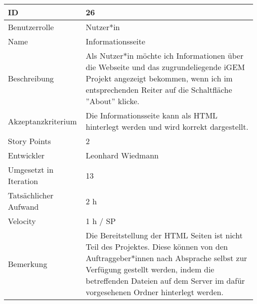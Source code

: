 \begin{tabularx}{\textwidth}{|p{}|X|}
	\hline
	ID & 26\\
	\hline
	Benutzerrolle & Nutzer*in\\
	\hline
	Name & Informationsseite\\
	\hline
	Beschreibung & Als Nutzer*in möchte ich Informationen über die Webseite und das zugrundeliegende iGEM Projekt angezeigt bekommen, wenn ich im entsprechenden Reiter auf die Schaltfläche ''About'' klicke.\\
	\hline
	Akzeptanzkriterium & Die Informationsseite kann als HTML hinterlegt werden und wird korrekt dargestellt.\\
	\hline
	Story Points & 2\\
	\hline
	Entwickler & Leonhard Wiedmann\\
	\hline
	Umgesetzt in Iteration & 13\\
	\hline
	Tatsächlicher Aufwand & 2 h\\
	\hline
	Velocity & 1 h / SP\\
	\hline
	Bemerkung & Die Bereitstellung der HTML Seiten ist nicht Teil des Projektes. Diese können von den Auftraggeber*innen nach Absprache selbst zur Verfügung gestellt werden, indem die betreffenden Dateien auf dem Server im dafür vorgesehenen Ordner hinterlegt werden.\\
	\hline
\end{tabularx}
\vspace{20pt}
